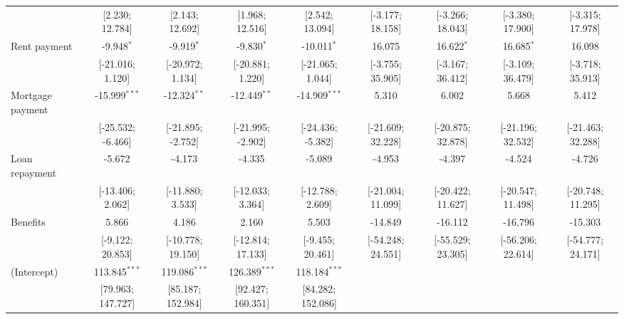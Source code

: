 \begin{table}[htbp]
\begin{threeparttable}[b]
\begin{tabular}{lcccccccc}
                                     & [2.230; 12.784]   & [2.143; 12.692]    & [1.968; 12.516]    & [2.542; 13.094]   & [-3.177; 18.158]    & [-3.266; 18.043]    & [-3.380; 17.900]    & [-3.315; 17.978]\\   
         Rent payment                & -9.948$^{*}$      & -9.919$^{*}$       & -9.830$^{*}$       & -10.011$^{*}$     & 16.075              & 16.622$^{*}$        & 16.685$^{*}$        & 16.098\\   
                                     & [-21.016; 1.120]  & [-20.972; 1.134]   & [-20.881; 1.220]   & [-21.065; 1.044]  & [-3.755; 35.905]    & [-3.167; 36.412]    & [-3.109; 36.479]    & [-3.718; 35.913]\\   
         Mortgage payment            & -15.999$^{***}$   & -12.324$^{**}$     & -12.449$^{**}$     & -14.909$^{***}$   & 5.310               & 6.002               & 5.668               & 5.412\\   
                                     & [-25.532; -6.466] & [-21.895; -2.752]  & [-21.995; -2.902]  & [-24.436; -5.382] & [-21.609; 32.228]   & [-20.875; 32.878]   & [-21.196; 32.532]   & [-21.463; 32.288]\\   
         Loan repayment              & -5.672            & -4.173             & -4.335             & -5.089            & -4.953              & -4.397              & -4.524              & -4.726\\   
                                     & [-13.406; 2.062]  & [-11.880; 3.533]   & [-12.033; 3.364]   & [-12.788; 2.609]  & [-21.004; 11.099]   & [-20.422; 11.627]   & [-20.547; 11.498]   & [-20.748; 11.295]\\   
         Benefits                    & 5.866             & 4.186              & 2.160              & 5.503             & -14.849             & -16.112             & -16.796             & -15.303\\   
                                     & [-9.122; 20.853]  & [-10.778; 19.150]  & [-12.814; 17.133]  & [-9.455; 20.461]  & [-54.248; 24.551]   & [-55.529; 23.305]   & [-56.206; 22.614]   & [-54.777; 24.171]\\   
         (Intercept)                 & 113.845$^{***}$   & 119.086$^{***}$    & 126.389$^{***}$    & 118.184$^{***}$   &                     &                     &                     &   \\   
                                     & [79.963; 147.727] & [85.187; 152.984]  & [92.427; 160.351]  & [84.282; 152.086] &                     &                     &                     &   \\   

\end{tabular}
\end{threeparttable}
\end{table}

